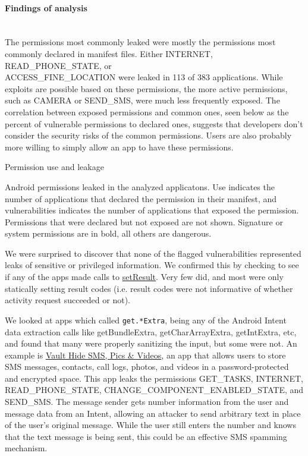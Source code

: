\documentclass[12pt,a4paper]{article}
\begin{document}
\paragraph{Findings of analysis} ~\\
The permissions most commonly leaked were mostly the permissions most commonly
declared in manifest files. Either INTERNET, READ\_PHONE\_STATE, or\\
ACCESS\_FINE\_LOCATION were leaked in 113 of 383 applications. While exploits
are possible based on these permissions, the more active permissions, such as
CAMERA or SEND\_SMS, were much less frequently exposed. The correlation between
exposed permissions and common ones, seen below as the percent of vulnerable
permissions to declared ones, suggests that developers don't consider the
security risks of the common permissions. Users are also probably more willing
to simply allow an app to have these permissions.
\begin{table}
\caption{Permission use and leakage}

\caption*{Android permissions leaked in the analyzed applicatons. Use indicates
  the number of applications that declared the permission in their
  manifest, and vulnerabilities indicates the number of applications that
  exposed the permission.  Permissions that were declared but not exposed
  are not shown. Signature or system permissions are in bold, all others
  are dangerous.}
\end{table}

We were surprised to discover that none of the flagged vulnerabilities
represented leaks of sensitive or privileged information. We confirmed this by
checking to see if any of the apps made calls to
\href{https://developer.android.com/reference/android/app/Activity.html#setResult\%28int\%29}{setResult}. Very
few did, and most were only statically setting result codes (i.e. result codes
were not informative of whether activity request succeeded or not).

We looked at apps which called \texttt{get.*Extra}, being any of the Android
Intent data extraction calls like getBundleExtra, getCharArrayExtra,
getIntExtra, etc, and found that many were properly sanitizing the input, but
some were not. An example is
\href{https://play.google.com/store/apps/details?id=com.netqin.ps\&feature=search\_result#?t=W251bGwsMSwxLDEsImNvbS5uZXRxaW4ucHMiXQ..}{Vault
Hide SMS, Pics \& Videos}, an app that allows users to store SMS messages,
contacts, call logs, photos, and videos in a password-protected and encrypted
space. This app leaks the permissions GET\_TASKS, INTERNET, READ\_PHONE\_STATE,
CHANGE\_COMPONENT\_ENABLED\_STATE, and SEND\_SMS. The message sender gets number
information from the user and message data from an Intent, allowing an attacker
to send arbitrary text in place of the user's original message. While the user
still enters the number and knows that the text message is being sent, this
could be an effective SMS spamming mechanism.
\end{document}
